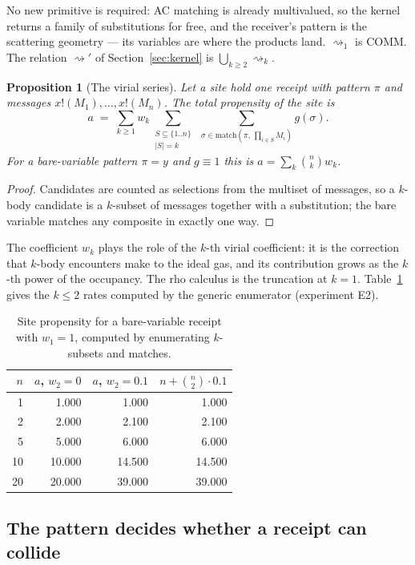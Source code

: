 \documentclass[11pt,a4paper]{article}
\theoremstyle{plain}
\newtheorem{proposition}[theorem]{Proposition}
\theoremstyle{definition}
\theoremstyle{remark}
\newcommand{\rhoc}{\textsf{rho}}
\newcommand{\red}{\rightsquigarrow}
\newcommand{\cred}{\rightsquigarrow'}
\newcommand{\match}{\mathrm{match}}
\begin{document}
No new primitive is required: AC matching is already multivalued, so the kernel
returns a family of substitutions for free, and the receiver's pattern is the
scattering geometry --- its variables are where the products land.
$\red_1$ is COMM. The relation $\cred$ of Section~\ref{sec:kernel} is
$\bigcup_{k\geq2}\red_k$.

\begin{proposition}[The virial series]\label{prop:virial}
Let a site hold one receipt with pattern $\pi$ and messages
$x!(M_1),\dots,x!(M_n)$. The total propensity of the site is
\[
a \;=\; \sum_{k\geq1} w_k \sum_{\substack{S\subseteq\{1..n\}\\|S|=k}}
\;\sum_{\sigma\in\match(\pi,\,\prod_{i\in S}M_i)} g(\sigma).
\]
For a bare-variable pattern $\pi=y$ and $g\equiv1$ this is
$a=\sum_k \binom{n}{k}w_k$.
\end{proposition}

\begin{proof}
Candidates are counted as selections from the multiset of messages, so a
$k$-body candidate is a $k$-subset of messages together with a substitution;
the bare variable matches any composite in exactly one way.
\end{proof}

The coefficient $w_k$ plays the role of the $k$-th virial coefficient: it is the
correction that $k$-body encounters make to the ideal gas, and its contribution
grows as the $k$-th power of the occupancy. The \rhoc{} calculus is the
truncation at $k=1$. Table~\ref{tab:virial} gives the $k\leq2$ rates computed by
the generic enumerator (experiment E2).

\begin{table}[ht]
\centering
\begin{tabular}{rrrr}
\toprule
$n$ & $a$, $w_2=0$ & $a$, $w_2=0.1$ & $n + \binom n2 \cdot 0.1$ \\
\midrule
1 & 1.000 & 1.000 & 1.000\\
2 & 2.000 & 2.100 & 2.100\\
5 & 5.000 & 6.000 & 6.000\\
10 & 10.000 & 14.500 & 14.500\\
20 & 20.000 & 39.000 & 39.000\\
\bottomrule
\end{tabular}
\caption{Site propensity for a bare-variable receipt with $w_1=1$, computed by
enumerating $k$-subsets and matches.}
\label{tab:virial}
\end{table}

\subsection{The pattern decides whether a receipt can collide}
\end{document}
